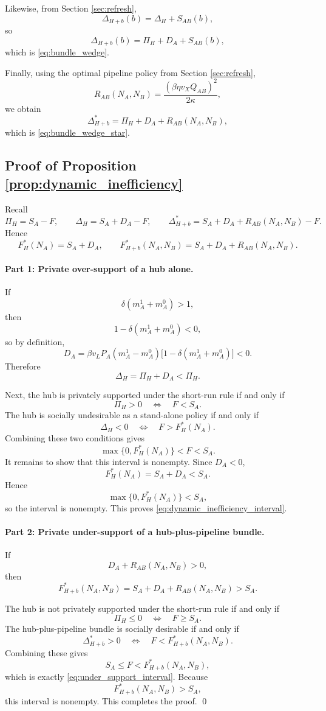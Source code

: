 Likewise, from Section \ref{sec:refresh},
\[
\Delta_{H+b}(b)=\Delta_H+S_{AB}(b),
\]
so
\[
\Delta_{H+b}(b)=\Pi_H+D_A+S_{AB}(b),
\]
which is \eqref{eq:bundle_wedge}.

Finally, using the optimal pipeline policy from Section \ref{sec:refresh},
\[
R_{AB}(N_A,N_B)
=
\frac{(\beta\eta v_XQ_{AB})^2}{2\kappa},
\]
we obtain
\[
\Delta_{H+b}^*=\Pi_H+D_A+R_{AB}(N_A,N_B),
\]
which is \eqref{eq:bundle_wedge_star}.

\subsection{Proof of Proposition \ref{prop:dynamic_inefficiency}}

Recall
\[
\Pi_H=S_A-F,
\qquad
\Delta_H=S_A+D_A-F,
\qquad
\Delta_{H+b}^*=S_A+D_A+R_{AB}(N_A,N_B)-F.
\]
Hence
\[
F_H^*(N_A)=S_A+D_A,
\qquad
F_{H+b}^*(N_A,N_B)=S_A+D_A+R_{AB}(N_A,N_B).
\]

\paragraph{Part 1: Private over-support of a hub alone.}
If
\[
\delta(m_A^1+m_A^0)>1,
\]
then
\[
1-\delta(m_A^1+m_A^0)<0,
\]
so by definition,
\[
D_A=\beta v_LP_A(m_A^1-m_A^0)\bigl[1-\delta(m_A^1+m_A^0)\bigr]<0.
\]
Therefore
\[
\Delta_H=\Pi_H+D_A<\Pi_H.
\]

Next, the hub is privately supported under the short-run rule if and only if
\[
\Pi_H>0
\quad\Longleftrightarrow\quad
F<S_A.
\]
The hub is socially undesirable as a stand-alone policy if and only if
\[
\Delta_H<0
\quad\Longleftrightarrow\quad
F>F_H^*(N_A).
\]
Combining these two conditions gives
\[
\max\{0,F_H^*(N_A)\}<F<S_A.
\]
It remains to show that this interval is nonempty. Since $D_A<0$,
\[
F_H^*(N_A)=S_A+D_A<S_A.
\]
Hence
\[
\max\{0,F_H^*(N_A)\}<S_A,
\]
so the interval is nonempty. This proves \eqref{eq:dynamic_inefficiency_interval}.

\paragraph{Part 2: Private under-support of a hub-plus-pipeline bundle.}
If
\[
D_A+R_{AB}(N_A,N_B)>0,
\]
then
\[
F_{H+b}^*(N_A,N_B)=S_A+D_A+R_{AB}(N_A,N_B)>S_A.
\]

The hub is not privately supported under the short-run rule if and only if
\[
\Pi_H\le 0
\quad\Longleftrightarrow\quad
F\ge S_A.
\]
The hub-plus-pipeline bundle is socially desirable if and only if
\[
\Delta_{H+b}^*>0
\quad\Longleftrightarrow\quad
F<F_{H+b}^*(N_A,N_B).
\]
Combining these gives
\[
S_A\le F<F_{H+b}^*(N_A,N_B),
\]
which is exactly \eqref{eq:under_support_interval}. Because
\[
F_{H+b}^*(N_A,N_B)>S_A,
\]
this interval is nonempty. This completes the proof.
\qed
